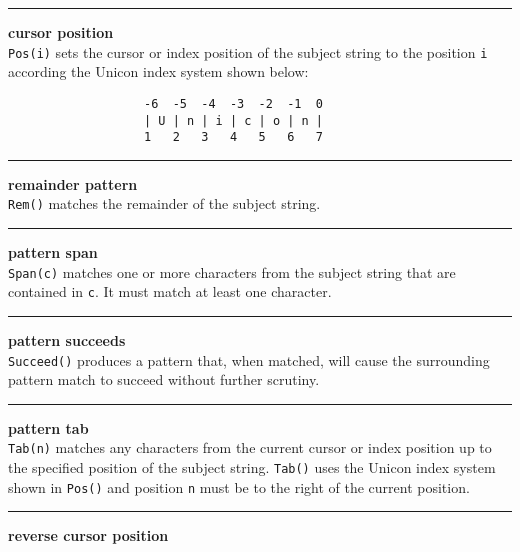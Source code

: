 \bigskip\hrule\vspace{0.1cm}
 \hfill{\bf cursor position}\\

\noindent
\texttt{Pos(i)} sets the cursor or index position of the subject string to
the position \texttt{i} according the Unicon index system shown below:
\begin{verbatim}
                   -6  -5  -4  -3  -2  -1  0
                   | U | n | i | c | o | n |
                   1   2   3   4   5   6   7
\end{verbatim}


\bigskip\hrule\vspace{0.1cm}
 \hfill{\bf remainder pattern}\\

\noindent
\texttt{Rem()} matches the remainder of the subject string.\\


\bigskip\hrule\vspace{0.1cm}
 \hfill{\bf pattern span}\\

\noindent
\texttt{Span(c)} matches one or more characters from the subject string that
are contained in \texttt{c}.  It must match at least one character.\\


\bigskip\hrule\vspace{0.1cm}
 \hfill{\bf pattern succeeds}\\

\noindent
\texttt{Succeed()} produces a pattern that, when matched, will cause
the surrounding pattern match to succeed without further scrutiny.\\


\bigskip\hrule\vspace{0.1cm}
 \hfill{\bf pattern tab}\\

\noindent
\texttt{Tab(n)} matches any characters from the current cursor or
index position up to
the specified position of the subject string.  \texttt{Tab()} uses the
Unicon index system shown in \texttt{Pos()} and position \texttt{n} must
be to the right of the current position.\\


\bigskip\hrule\vspace{0.1cm}
 \hfill{\bf reverse cursor position}\\

